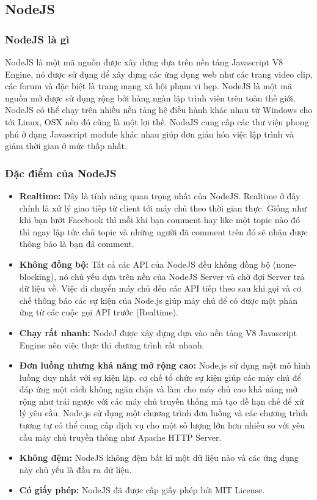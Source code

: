 \subsection{NodeJS}
\subsubsection{NodeJS là gì}

\begin{center}
  \captionsetup{type=figure}
  
\end{center}


NodeJS là một mã nguồn được xây dựng dựa trên nền tảng Javascript V8 Engine, nó được sử dụng để xây dựng các ứng dụng web như các trang video clip, các forum và đặc biệt là trang mạng xã hội phạm vi hẹp. NodeJS là một mã nguồn mở được sử dụng rộng bởi hàng ngàn lập trình viên trên toàn thế giới. NodeJS có thể chạy trên nhiều nền tảng hệ điều hành khác nhau từ Windows cho tới Linux, OSX nên đó cũng là một lợi thế. NodeJS cung cấp các thư viện phong phú ở dạng Javascript module khác nhau giúp đơn giản hóa việc lập trình và giảm thời gian ở mức thấp nhất.

\subsubsection{Đặc điểm của NodeJS}

\begin{itemize}
  \item \textbf{Realtime:} Đây là tính năng quan trọng nhất của NodeJS. Realtime ở đây chính là xử lý giao tiếp từ client tới máy chủ theo thời gian thực. Giống như khi bạn lướt Facebook thì mỗi khi bạn comment hay like một topic nào đó thì ngay lập tức chủ topic và những người đã comment trên đó sẽ nhận được thông báo là bạn đã comment.
  \item \textbf{Không đồng bộ:} Tất cả các API của NodeJS đều không đồng bộ (none-blocking), nó chủ yếu dựa trên nền của NodeJS Server và chờ đợi Server trả dữ liệu về. Việc di chuyển máy chủ đến các API tiếp theo sau khi gọi và cơ chế thông báo các sự kiện của Node.js giúp máy chủ để có được một phản ứng từ các cuộc gọi API trước (Realtime).
  \item \textbf{Chạy rất nhanh:} NodeJ được xây dựng dựa vào nền tảng V8 Javascript Engine nên việc thực thi chương trình rất nhanh.
  \item \textbf{Đơn luồng nhưng khả năng mở rộng cao:} Node.js sử dụng một mô hình luồng duy nhất với sự kiện lặp. cơ chế tổ chức sự kiện giúp các máy chủ để đáp ứng một cách không ngăn chặn và làm cho máy chủ cao khả năng mở rộng như trái ngược với các máy chủ truyền thống mà tạo đề hạn chế để xử lý yêu cầu. Node.js sử dụng một chương trình đơn luồng và các chương trình tương tự có thể cung cấp dịch vụ cho một số lượng lớn hơn nhiều so với yêu cầu máy chủ truyền thống như Apache HTTP Server.
  \item \textbf{Không đệm:} NodeJS không đệm bất kì một dữ liệu nào và các ứng dụng này chủ yếu là đầu ra dữ liệu.
  \item \textbf{Có giấy phép:} NodeJS đã được cấp giấy phép bởi MIT License.
\end{itemize}

